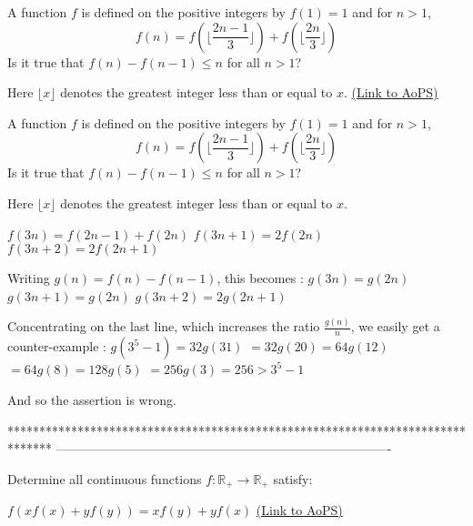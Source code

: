 \begin{problem}
	A function $f$ is defined on the positive integers by $f(1) = 1$ and for $n>1$, \[ f(n) = f( \lfloor\frac{2n-1}{3} \rfloor ) +  f( \lfloor\frac{2n}{3} \rfloor ) \] Is it true that $f(n) - f(n-1) \le n$ for all $n>1$?

Here $\lfloor x \rfloor$ denotes the greatest integer less than or equal to $x$.
	\flushright \href{https://artofproblemsolving.com/community/c6h472924}{(Link to AoPS)}
\end{problem}



\begin{solution}
	\begin{tcolorbox}A function $f$ is defined on the positive integers by $f(1) = 1$ and for $n>1$, \[ f(n) = f( \lfloor\frac{2n-1}{3} \rfloor ) +  f( \lfloor\frac{2n}{3} \rfloor ) \] Is it true that $f(n) - f(n-1) \le n$ for all $n>1$?

Here $\lfloor x \rfloor$ denotes the greatest integer less than or equal to $x$.\end{tcolorbox}
$f(3n)=f(2n-1)+f(2n)$
$f(3n+1)=2f(2n)$
$f(3n+2)=2f(2n+1)$

Writing $g(n)=f(n)-f(n-1)$, this becomes :
$g(3n)=g(2n)$
$g(3n+1)=g(2n)$
$g(3n+2)=2g(2n+1)$

Concentrating on the last line, which increases the ratio $\frac{g(n)}n$, we easily get a counter-example :
$g(3^5-1)=32g(31)$ $=32g(20)=64g(12)$ $=64g(8)=128g(5)$ $=256g(3)=256>3^5-1$

And so the assertion is wrong.
\end{solution}
*******************************************************************************
-------------------------------------------------------------------------------

\begin{problem}
	Determine all continuous functions $f:\mathbb{R}_{+}\rightarrow \mathbb{R}_{+}$ satisfy:

$f(xf(x)+yf(y))=xf(y)+yf(x)$
	\flushright \href{https://artofproblemsolving.com/community/c6h473050}{(Link to AoPS)}
\end{problem}



